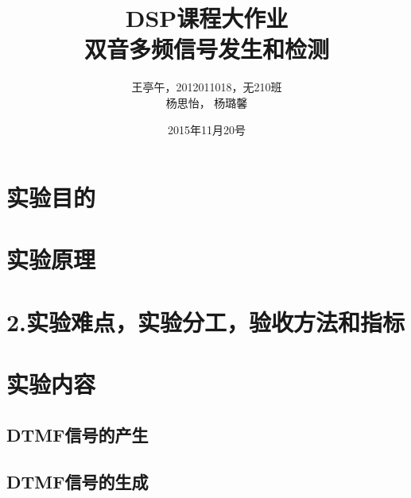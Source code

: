 \documentclass{article}
\begin{document}
\begin{CJK}{UTF8}{gbsn}
\title{DSP课程大作业\\
双音多频信号发生和检测}
\author{王亭午，2012011018，无210班\\
杨思怡，
杨璐馨
}
\date{2015年11月20号}
\maketitle
\section{实验目的}
\section{实验原理}
\section{2.实验难点，实验分工，验收方法和指标}
\section{实验内容}
\subsection{DTMF信号的产生}
\subsection{DTMF信号的生成}



\end{CJK}
\end{document}
